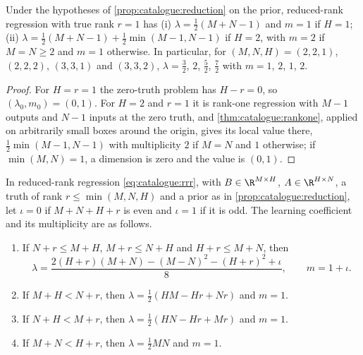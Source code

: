 \begin{refsection}
\begin{corollary}\label{cor:catalogue:small}
Under the hypotheses of \cref{prop:catalogue:reduction} on the prior, reduced-rank regression with true rank $r=1$ has (i) $\lambda=\frac12(M+N-1)$ and $m=1$ if $H=1$; (ii) $\lambda=\frac12(M+N-1)+\frac12\min(M-1,N-1)$ if $H=2$, with $m=2$ if $M=N\ge2$ and $m=1$ otherwise. In particular, for $(M,N,H)=(2,2,1)$, $(2,2,2)$, $(3,3,1)$ and $(3,3,2)$, $\lambda=\frac32$, $2$, $\frac52$, $\frac72$ with $m=1$, $2$, $1$, $2$.
\end{corollary}

\begin{proof}
For $H=r=1$ the zero-truth problem has $H-r=0$, so $(\lambda_0,m_0)=(0,1)$. For $H=2$ and $r=1$ it is rank-one regression with $M-1$ outputs and $N-1$ inputs at the zero truth, and \cref{thm:catalogue:rankone}, applied on arbitrarily small boxes around the origin, gives its local value there, $\frac12\min(M-1,N-1)$ with multiplicity $2$ if $M=N$ and $1$ otherwise; if $\min(M,N)=1$, a dimension is zero and the value is $(0,1)$.
\end{proof}

\begin{theorem}\label{thm:catalogue:aoyagi}
In reduced-rank regression \eqref{eq:catalogue:rrr}, with $B\in\R^{M\times H}$, $A\in\R^{H\times N}$, a truth of rank $r\le\min(M,N,H)$ and a prior as in \cref{prop:catalogue:reduction}, let $\iota=0$ if $M+N+H+r$ is even and $\iota=1$ if it is odd. The learning coefficient and its multiplicity are as follows.
\begin{enumerate}
\item If $N+r\le M+H$, $M+r\le N+H$ and $H+r\le M+N$, then
\[
\lambda=\frac{2(H+r)(M+N)-(M-N)^2-(H+r)^2+\iota}8,\qquad m=1+\iota.
\]
\item If $M+H<N+r$, then $\lambda=\frac12(HM-Hr+Nr)$ and $m=1$.
\item If $N+H<M+r$, then $\lambda=\frac12(HN-Hr+Mr)$ and $m=1$.
\item If $M+N<H+r$, then $\lambda=\frac12MN$ and $m=1$.
\end{enumerate}
\end{theorem}


\end{refsection}
